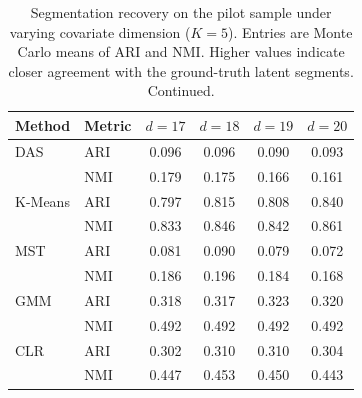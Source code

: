 \begin{table}[htbp]
\centering
\caption{Segmentation recovery on the pilot sample under varying covariate dimension ($K=5$). Entries are Monte Carlo means of ARI and NMI. Higher values indicate closer agreement with the ground-truth latent segments. Continued.}
\label{tab:app-ari-nmi-varying-d-cont}
\begin{tabular}{llcccc}
\toprule
Method & Metric & $d=17$ & $d=18$ & $d=19$ & $d=20$ \\
\midrule
DAS & ARI & 0.096 & 0.096 & 0.090 & 0.093 \\
 & NMI & 0.179 & 0.175 & 0.166 & 0.161 \\
\addlinespace
K-Means & ARI & 0.797 & 0.815 & 0.808 & 0.840 \\
 & NMI & 0.833 & 0.846 & 0.842 & 0.861 \\
\addlinespace
MST & ARI & 0.081 & 0.090 & 0.079 & 0.072 \\
 & NMI & 0.186 & 0.196 & 0.184 & 0.168 \\
\addlinespace
GMM & ARI & 0.318 & 0.317 & 0.323 & 0.320 \\
 & NMI & 0.492 & 0.492 & 0.492 & 0.492 \\
\addlinespace
CLR & ARI & 0.302 & 0.310 & 0.310 & 0.304 \\
 & NMI & 0.447 & 0.453 & 0.450 & 0.443 \\
\bottomrule
\end{tabular}
\end{table}
